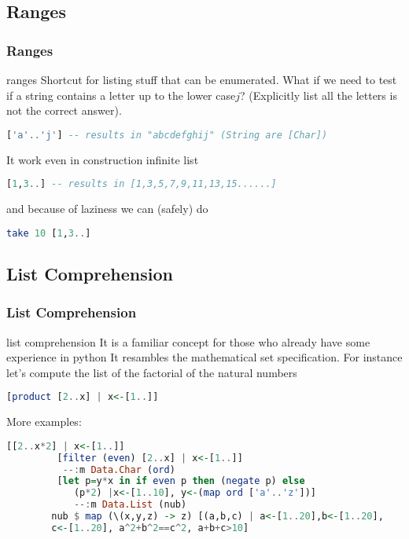 	\subsection{Ranges}
	\begin{frame}[fragile]\frametitle{Ranges}
		\begin{exampleblock}{ranges}
		Shortcut for  listing stuff that can be enumerated. What if we need to test if
		a string contains a letter up to the lower case$j$? (Explicitly list all the
		letters is not the correct answer).
		\begin{lstlisting}[language=Haskell,basicstyle=\footnotesize\ttfamily] 
			['a'..'j'] -- results in "abcdefghij" (String are [Char])			
		\end{lstlisting}
		It work even in construction infinite list
		\begin{lstlisting}[language=Haskell,basicstyle=\footnotesize\ttfamily] 
			[1,3..] -- results in [1,3,5,7,9,11,13,15......]			
		\end{lstlisting}
		and because of laziness we can (safely) do
		\begin{lstlisting}[language=Haskell,basicstyle=\footnotesize\ttfamily] 
			take 10 [1,3..] 		
		\end{lstlisting}
		\end{exampleblock}
		
	\end{frame}
	
	\subsection{List Comprehension}
	\begin{frame}[fragile]\frametitle{List Comprehension}
		\begin{exampleblock}{list comprehension}
		It is a familiar concept for those who already have some experience in python
		It resambles the mathematical set specification. For instance let's compute
		the list of the factorial of the natural numbers 
		 \begin{lstlisting}[language=Haskell,basicstyle=\footnotesize\ttfamily] 
		 [product [2..x] | x<-[1..]] 		
		\end{lstlisting} 
		\end{exampleblock}
		More examples:
		\begin{lstlisting}[language=Haskell,basicstyle=\footnotesize\ttfamily] 
		 [[2..x*2] | x<-[1..]]
		 [filter (even) [2..x] | x<-[1..]]
		  --:m Data.Char (ord)
		 [let p=y*x in if even p then (negate p) else 
		 	(p*2) |x<-[1..10], y<-(map ord ['a'..'z'])]
		 	--:m Data.List (nub) 
		nub $ map (\(x,y,z) -> z) [(a,b,c) | a<-[1..20],b<-[1..20],
		c<-[1..20], a^2+b^2==c^2, a+b+c>10]
		\end{lstlisting}
			
		
	\end{frame}
	
	